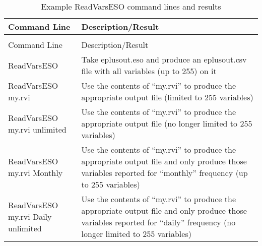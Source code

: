 \begin{longtable}[c]{p{1.5in}p{4.5in}}
\caption{Example ReadVarsESO command lines and results \label{table:example-readvarseso-command-lines-and-results}} \tabularnewline
\toprule
Command Line & Description/Result \tabularnewline
\midrule
\endfirsthead

\caption[]{Example ReadVarsESO command lines and results} \tabularnewline
\toprule
Command Line & Description/Result \tabularnewline
\midrule
\endhead

ReadVarsESO & Take eplusout.eso and produce an eplusout.csv file with all variables (up to 255) on it \tabularnewline
ReadVarsESO my.rvi & Use the contents of “my.rvi” to produce the appropriate output file (limited to 255 variables) \tabularnewline
ReadVarsESO my.rvi unlimited & Use the contents of “my.rvi” to produce the appropriate output file (no longer limited to 255 variables) \tabularnewline
ReadVarsESO my.rvi Monthly & Use the contents of “my.rvi” to produce the appropriate output file and only produce those variables reported for “monthly” frequency (up to 255 variables) \tabularnewline
ReadVarsESO my.rvi Daily unlimited & Use the contents of “my.rvi” to produce the appropriate output file and only produce those variables reported for “daily” frequency (no longer limited to 255 variables) \tabularnewline
\bottomrule
\end{longtable}